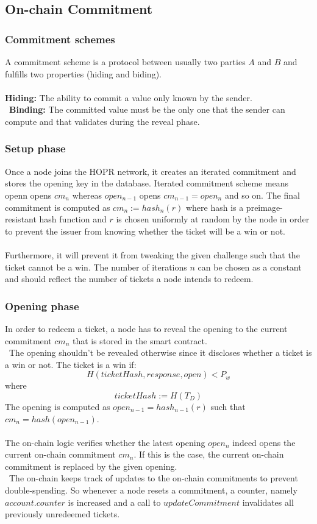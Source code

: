 \subsection{On-chain Commitment}

\subsubsection*{Commitment schemes}
A commitment scheme is a protocol between usually two parties $A$ and $B$ and fulfills two properties (hiding and biding).
\\~\\\textbf{Hiding:} The ability to commit a value only known by the sender.
\\~\textbf{Binding:} The committed value must be the only one that the sender can compute and that validates during the reveal phase. 


\subsubsection{Setup phase}
Once a node joins the HOPR network, it creates an iterated commitment and stores the opening key in the database. 
Iterated commitment scheme means openn opens $cm_n$ whereas $open_{n-1}$ opens $cm_{n-1}=open_n$ and so on. 
\newline The final commitment is computed as $cm_n:= hash_n(r)$ where hash is a preimage-resistant hash function and 
$r$ is chosen uniformly at random by the node in order to prevent the issuer from knowing whether the ticket will be a win or not. 
\\~\\ Furthermore, it will prevent it from tweaking the given challenge such that the ticket cannot be a win.
The number of iterations $n$ can be chosen as a constant and should reflect the number of tickets a node intends to redeem.

\subsubsection{Opening phase}
In order to redeem a ticket, a node has to reveal the opening to the current commitment $cm_n$ that is stored in the smart contract. 
\\~The opening shouldn’t be revealed otherwise since it discloses whether a ticket is a win or not.
The ticket is a win if: $$H( ticketHash, response, open ) <P_w$$ where $$ticketHash:=H(T_D)$$
The opening is computed as $open_{n-1} = hash_{n-1}(r)$ such that $cm_n=hash( open_{n-1})$. 
\\~\\The on-chain logic verifies whether the latest opening $open_n$ indeed opens the current on-chain commitment $cm_n$. 
If this is the case, the current on-chain commitment is replaced by the given opening. 
\\~The on-chain keeps track of updates to the on-chain commitments to prevent double-spending. 
So whenever a node resets a commitment, a counter, namely $account.counter$ is increased and a call to $updateCommitment$ invalidates all previously unredeemed tickets.








